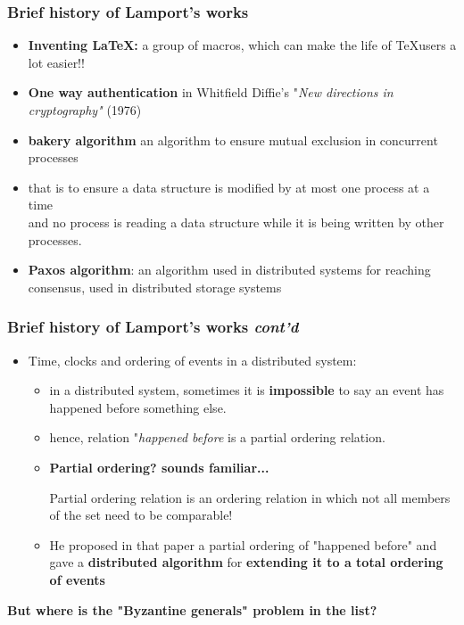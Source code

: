 \documentclass{beamer}
\begin{document}
\begin{frame}[label=works]
	\frametitle{Brief history of Lamport's works}
	\begin{itemize}
		\item<1-> \textbf{Inventing \LaTeX: }\small a group of macros, which can make the life of \TeX users a lot easier!!
		\item<1-> \textbf{One way authentication} in Whitfield Diffie's "\textit{New directions in cryptography"} (1976)
		\item <1-> \textbf{bakery algorithm} an algorithm to ensure mutual exclusion in concurrent processes
		\item <2->  that is to ensure a data structure is modiﬁed by at most one process at a time
		\\ and no process is reading a data structure while it is being written by other processes. 
		\item <3-> \textbf {Paxos algorithm}: an algorithm used in distributed systems for reaching consensus, used in distributed storage systems
	\end{itemize}
\end{frame}

\begin{frame}
	\frametitle{Brief history of Lamport's works \textit{cont'd}}
	\begin{itemize}
		\item <1-> Time, clocks and ordering of events in a distributed system:
		\begin{itemize}
			\item<2-> \footnotesize in a distributed system, sometimes it is \textbf{impossible} to say an event has happened before something else. 
			\item <3-7> \footnotesize hence, relation "\textit{happened before} is a partial ordering relation.
			\item <4-5> \textbf{Partial ordering? sounds familiar...}
			\alt<5> {\begin{definition} 
				Partial ordering relation is an ordering relation in which not all members of the set need to be comparable!
			\end{definition}}{}
		\item <6-> \footnotesize He proposed in that paper a partial ordering of "happened before" and gave a \textbf{distributed algorithm} for \textbf{extending it to a total ordering of events}
		\newline \newline
		
		\end{itemize}
	\end{itemize}
 {\centering \large \textbf{But where is the "Byzantine generals" problem in the list?}}
\end{frame}
\end{document}
